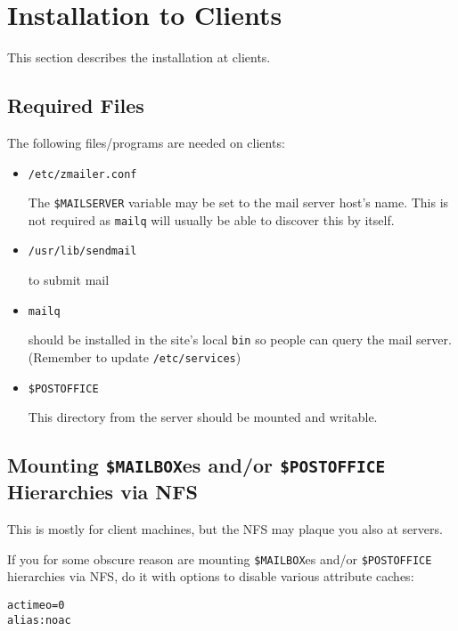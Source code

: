 \section{Installation to Clients}

This section describes the installation at clients.


\subsection{Required Files}

The following files/programs are needed on clients:
\begin{itemize}
\item {\tt /etc/zmailer.conf}

The {\tt \$MAILSERVER} variable may be set to the mail server host's name.
This is not required as {\tt mailq} will usually be able to discover this
by itself.

\vspace{1pt}
\item {\tt /usr/lib/sendmail}

to submit mail

\vspace{1pt}
\item {\tt mailq}

should be installed in the site's local {\tt bin} so people
can query the mail server. (Remember to update {\tt /etc/services})

\vspace{1pt}
\item {\tt \$POSTOFFICE}

This directory from the server should be mounted and writable.
\end{itemize}


\subsection{Mounting {\tt \$MAILBOX}es and/or {\tt \$POSTOFFICE} Hierarchies via NFS}

This is mostly for client machines,
but the NFS may plaque you also at servers.

If you for some obscure reason are mounting {\tt \$MAILBOX}es
and/or {\tt \$POSTOFFICE} hierarchies via NFS, do it with
options to disable various attribute caches:
\begin{alltt}
              actimeo=0
    alias:    noac
\end{alltt}

